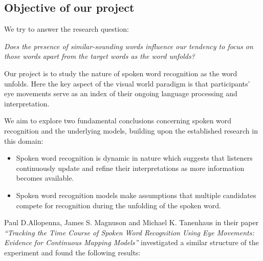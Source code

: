 \documentclass[
  a4paper,
]{article}
\providecommand{\tightlist}{%
  \setlength{\itemsep}{0pt}\setlength{\parskip}{0pt}}\usepackage{longtable,booktabs,array}
\begin{document}
\hypertarget{objective-of-our-project}{%
\subsection{Objective of our project}\label{objective-of-our-project}}

We try to answer the research question:

\emph{Does the presence of similar-sounding words influence our tendency
to focus on those words apart from the target words as the word
unfolds?}

Our project is to study the nature of spoken word recognition as the
word unfolds. Here the key aspect of the visual world paradigm is that
participants' eye movements serve as an index of their ongoing language
processing and interpretation.

We aim to explore two fundamental conclusions concerning spoken word
recognition and the underlying models, building upon the established
research in this domain:

\begin{itemize}
\tightlist
\item
  Spoken word recognition is dynamic in nature which suggests that
  listeners continuously update and refine their interpretations as more
  information becomes available.
\item
  Spoken word recognition models make assumptions that multiple
  candidates compete for recognition during the unfolding of the spoken
  word.
\end{itemize}

Paul D.Allopenna, James S. Magnuson and Michael K. Tanenhaus in their
paper \emph{``Tracking the Time Course of Spoken Word Recognition Using
Eye Movements: Evidence for Continuous Mapping Models''} investigated a
similar structure of the experiment and found the following results:
\end{document}
